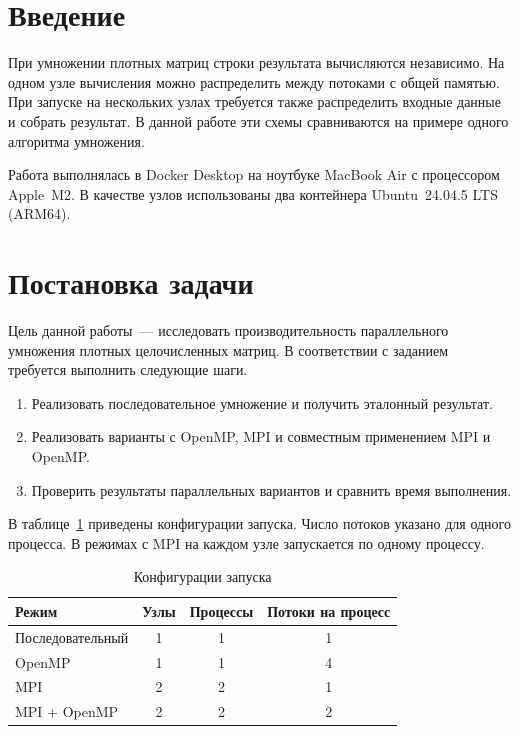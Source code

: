 





\tableofcontents
\clearpage

\section*{Введение}

При умножении плотных матриц строки результата вычисляются независимо. На одном узле вычисления можно распределить между потоками с общей памятью. При запуске на нескольких узлах требуется также распределить входные данные и собрать результат. В данной работе эти схемы сравниваются на примере одного алгоритма умножения.

Работа выполнялась в Docker Desktop на ноутбуке MacBook Air с процессором Apple~M2. В качестве узлов использованы два контейнера Ubuntu~24.04.5 LTS (ARM64).

\section{Постановка задачи}

Цель данной работы~--- исследовать производительность параллельного умножения плотных целочисленных матриц. В соответствии с заданием~\cite{task} требуется выполнить следующие шаги.

\begin{enumerate}
  \item Реализовать последовательное умножение и получить эталонный результат.
  \item Реализовать варианты с OpenMP, MPI и совместным применением MPI и OpenMP.
  \item Проверить результаты параллельных вариантов и сравнить время выполнения.
\end{enumerate}

В таблице~\ref{tab:configs} приведены конфигурации запуска. Число потоков указано для одного процесса. В режимах с MPI на каждом узле запускается по одному процессу.

\begin{table}[H]
\centering
\small
\caption{Конфигурации запуска}\label{tab:configs}
\begin{tabular}{@{}lccc@{}}
\toprule
Режим & Узлы & Процессы & Потоки на процесс \\
\midrule
Последовательный & 1 & 1 & 1 \\
OpenMP & 1 & 1 & 4 \\
MPI & 2 & 2 & 1 \\
MPI + OpenMP & 2 & 2 & 2 \\
\bottomrule
\end{tabular}
\end{table}

